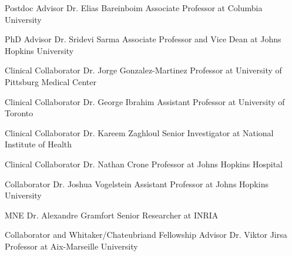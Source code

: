 \begin{cventries}
\cventry
    {Postdoc Advisor} %
    {Dr. Elias Bareinboim} %
    {Associate Professor at Columbia University} %
    {} %
    {\empty}
    \vspace{-\baselineskip}
    
\cventry
    {PhD Advisor} %
    {Dr. Sridevi Sarma} %
    {Associate Professor and Vice Dean at Johns Hopkins University} %
    {} %
    {\empty}
    \vspace{-\baselineskip}
    
\cventry
    {Clinical Collaborator} %
    {Dr. Jorge Gonzalez-Martinez} %
    {Professor at University of Pittsburg Medical Center} %
    {} %
    {\empty}
    \vspace{-\baselineskip}
    
\cventry
    {Clinical Collaborator} %
    {Dr. George Ibrahim} %
    {Assistant Professor at University of Toronto} %
    {} %
    {\empty}
    \vspace{-\baselineskip}
    
\cventry
    {Clinical Collaborator} %
    {Dr. Kareem Zaghloul} %
    {Senior Investigator at National Institute of Health} %
    {} %
    {\empty}
    \vspace{-\baselineskip}
    
\cventry
    {Clinical Collaborator} %
    {Dr. Nathan Crone} %
    {Professor at Johns Hopkins Hospital} %
    {} %
    {\empty}
    \vspace{-\baselineskip}
    
\cventry
    {Collaborator} %
    {Dr. Joshua Vogelstein} %
    {Assistant Professor at Johns Hopkins University} %
    {} %
    {\empty}
    \vspace{-\baselineskip}
    
\cventry
    {MNE} %
    {Dr. Alexandre Gramfort} %
    {Senior Researcher at INRIA} %
    {} %
    {\empty}
    \vspace{-\baselineskip}
    
\cventry
    {Collaborator and Whitaker/Chateubriand Fellowship Advisor} %
    {Dr. Viktor Jirsa} %
    {Professor at Aix-Marseille University} %
    {} %
    {\empty}
    \vspace{-\baselineskip}
    
\end{cventries}
